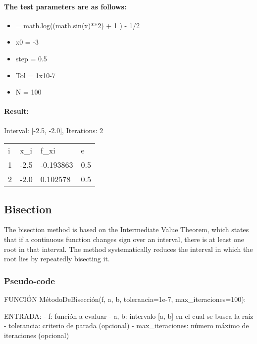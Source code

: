 \documentclass{article}
\begin{document}
    \paragraph{The test parameters are as follows:}
        \begin{itemize}
            \item {\textflorin = math.log((math.sin(x)**2) + 1 ) - 1/2}
            \item {x0 = -3}
            \item {step = 0.5}
            \item {Tol = 1x10-7}
            \item {N = 100}
        \end{itemize}

    \paragraph{Result:}
        Interval: [-2.5, -2.0], Iterations: 2

        \begin{table}[ht]
        \begin{tabular}{llll}
        i & x\_i & f\_xi     & e   \\
        1 & -2.5 & -0.193863 & 0.5 \\
        2 & -2.0 & 0.102578  & 0.5
        \end{tabular}\label{tab:table}
        \end{table}

    \subsection{Bisection}\label{subsec:bisection}

    The bisection method is based on the Intermediate Value Theorem, which states that if a continuous function changes
    sign over an interval, there is at least one root in that interval. The method systematically reduces the interval
    in which the root lies by repeatedly bisecting it.

    \subsubsection{Pseudo-code}
        FUNCIÓN MétodoDeBisección(f, a, b, tolerancia=1e-7, max_iteraciones=100):

            ENTRADA:
            - f: función a evaluar
            - a, b: intervalo [a, b] en el cual se busca la raíz
            - tolerancia: criterio de parada (opcional)
            - max_iteraciones: número máximo de iteraciones (opcional)
\end{document}
